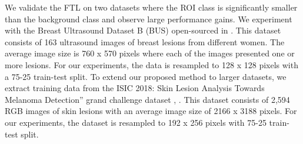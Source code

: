 \documentclass{article}
\begin{document}

We validate the FTL on two datasets where the ROI class is significantly smaller than the background class and observe large performance gains. We experiment with the Breast Ultrasound Dataset B (BUS) open-sourced in \cite{yap}. This dataset consists of 163 ultrasound images of breast lesions from different women. The average image size is 760 x 570 pixels where each of the images presented one or more lesions. For our experiments, the data is resampled to 128 x 128 pixels with a 75-25 train-test split. To extend our proposed method to larger datasets, we extract training data from the ISIC 2018: Skin Lesion Analysis Towards Melanoma Detection” grand challenge dataset \cite{isic1}, \cite{isic2}. This dataset consists of 2,594 RGB images of skin lesions with an average image size of 2166 x 3188 pixels. For our experiments, the dataset is resampled to 192 x 256 pixels with 75-25 train-test split.
\end{document}
